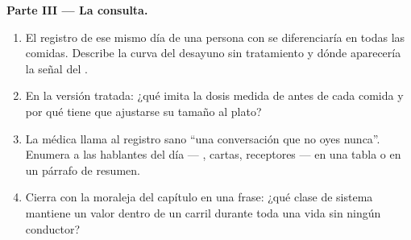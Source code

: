 \begin{problem}
\medskip\noindent\textbf{Parte III --- La consulta.}
\begin{enumerate}[resume]
  \item El registro de ese mismo día de una persona con  se
        diferenciaría en todas las comidas. Describe la curva del
        desayuno sin tratamiento y dónde aparecería la señal del .
  \item En la versión tratada: ¿qué imita la dosis medida de antes de
        cada comida y por qué tiene que ajustarse su tamaño al plato?
  \item La médica llama al registro sano ``una conversación que no oyes
        nunca''. Enumera a las hablantes del día --- , cartas,
        receptores --- en una tabla o en un párrafo de resumen.
  \item Cierra con la moraleja del capítulo en una frase: ¿qué clase de
        sistema mantiene un valor dentro de un carril durante toda una
        vida sin ningún conductor?
\end{enumerate}
\end{problem}
